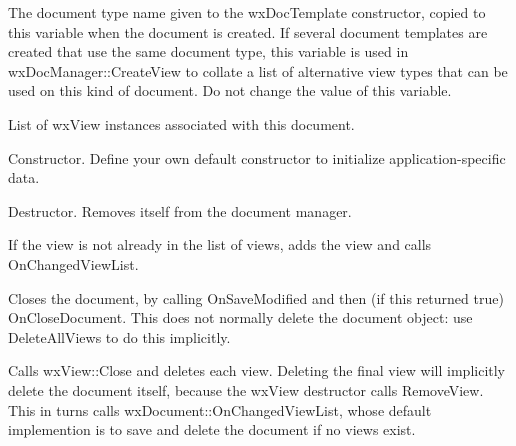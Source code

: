 \label{documenttypename}


The document type name given to the wxDocTemplate constructor, copied to this
variable when the document is created. If several document templates are
created that use the same document type, this variable is used in wxDocManager::CreateView
to collate a list of alternative view types that can be used on this kind of
document. Do not change the value of this variable.



List of wxView instances associated with this document.



Constructor. Define your own default constructor to initialize application-specific
data.



Destructor. Removes itself from the document manager.



If the view is not already in the list of views, adds the view and calls OnChangedViewList.



Closes the document, by calling OnSaveModified and then (if this returned true) OnCloseDocument.
This does not normally delete the document object: use DeleteAllViews to do this implicitly.



Calls wxView::Close and deletes each view. Deleting the final view will implicitly
delete the document itself, because the wxView destructor calls RemoveView. This
in turns calls wxDocument::OnChangedViewList, whose default implemention is to
save and delete the document if no views exist.



